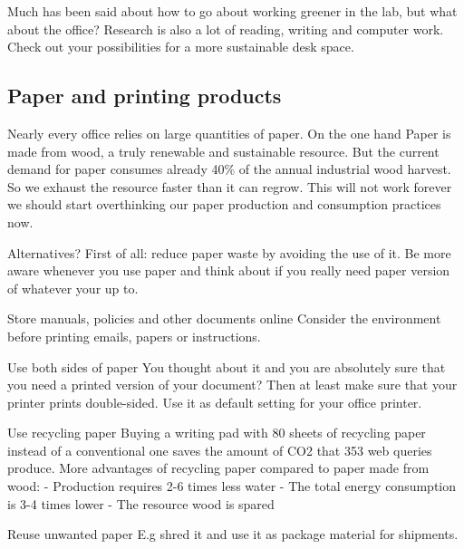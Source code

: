  Much has been said about how to go about working greener in the lab, but what about the office? Research is also a lot of reading, writing and computer work. Check out your possibilities for a more sustainable desk space. 
 
\subsection{Paper and printing products}
	
	Nearly every office relies on large quantities of paper. On the one hand Paper is made from wood, a truly renewable and sustainable resource. But the current demand for paper consumes already 40\% of the annual industrial wood harvest. So we exhaust the resource faster than it can regrow.  \cite{WWF} This will not work forever we should start overthinking our paper production and consumption practices now. 

\begin{suggest}{Alternatives?}
	First of all: reduce paper waste by avoiding the use of it. 
	Be more aware whenever you use paper and think about if you really need paper version of whatever your up to. 
\end{suggest}

\begin{suggest}{Store manuals, policies and other documents online}
		 Consider the environment before printing emails, papers or instructions. 
\end{suggest}

\begin{suggest}{Use both sides of paper}
	You thought about it and you are absolutely sure that you need a printed version of your document? Then at least make sure that your printer prints double-sided. Use it as default setting for your office printer.
\end{suggest}

\begin{suggest}{Use recycling paper}
	Buying a writing pad with 80 sheets of recycling paper instead of a conventional one 
	saves the amount of CO2 that 353 web queries produce.
	More advantages of recycling paper compared to paper made from wood:  
	- Production requires 2-6 times less water 
	- The total energy consumption is 3-4 times lower 
	- The resource wood is spared
\end{suggest}
	
\begin{suggest}{Reuse unwanted paper}
	E.g shred it and use it as package material for shipments. 
\end{suggest} 

